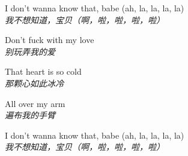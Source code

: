 \begin{spacing}{1.5}
\begin{flushleft}
I don't wanna know that, babe (ah, la, la, la, la)\\
\textit{我不想知道，宝贝（啊，啦，啦，啦，啦）}\lyricspace

Don't fuck with my love\\
\textit{别玩弄我的爱}\lyricspace

That heart is so cold\\
\textit{那颗心如此冰冷}\lyricspace

All over my arm\\
\textit{遍布我的手臂}\lyricspace

I don't wanna know that, babe (ah, la, la, la, la)\\
\textit{我不想知道，宝贝（啊，啦，啦，啦，啦）}\lyricspace
\end{flushleft}
\end{spacing} 
